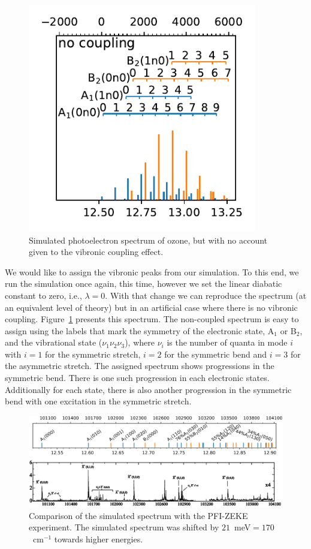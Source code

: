 \documentclass[12pt,prb,aps]{revtex4-2}
\begin{document}
\begin{figure}
    \includegraphics[width=10cm]{figures/spectrum_assigned.pdf}
    \caption{
        Simulated photoelectron spectrum of ozone, but with no account given
        to the vibronic coupling effect.
    }
    \label{fig:no_coupling}
\end{figure}

We would like to assign the vibronic peaks from our simulation. To this end,
we run the simulation once again, this time, however we set the linear
diabatic constant to zero, i.e., $\lambda = 0$. With that change we can
reproduce the spectrum (at an equivalent level of theory) but in an artificial
case where there is no vibronic coupling. Figure~\ref{fig:no_coupling}
presents this spectrum. The non-coupled spectrum is easy to assign using the
labels that mark the symmetry of the electronic state, A$_1$ or B$_2$, and the
vibrational state ($\nu _1 \nu_2 \nu_3$), where $\nu _i$ is the number of
quanta in mode $i$ with $i=1$ for the symmetric stretch, $i=2$ for the
symmetric bend and $i=3$ for the asymmetric stretch. The assigned spectrum
shows progressions in the symmetric bend. There is one such progression in
each electronic states.  Additionally for each state, there is also another
progression in the symmetric bend with one excitation in the symmetric
stretch.

\begin{figure}
    \includegraphics[width=16 cm]{./figures/sim_vs_zeke}
    \caption{
        Comparison of the simulated spectrum with the PFI-ZEKE
        experiment.\cite{Willitsch:O3ZEKE:2005} The simulated spectrum was
        shifted by $21$~meV$ = 170$~cm$^{-1}$ towards higher energies.
    }
    \label{fig:sim_vs_zeke}
\end{figure}
\end{document}
